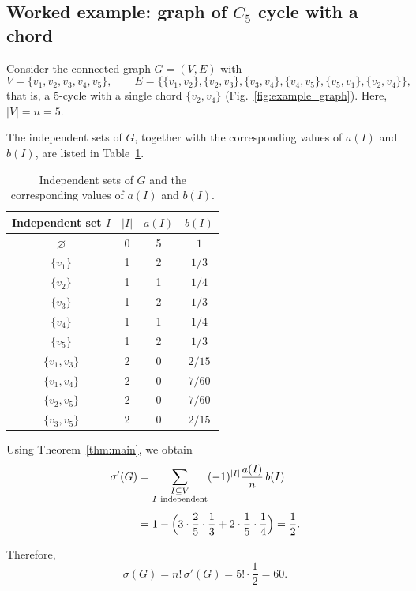 \documentclass[11pt,a4paper]{article}
\numberwithin{equation}{section}
\theoremstyle{plain}
\theoremstyle{definition}
\theoremstyle{remark}
\begin{document}
\subsection{Worked example: graph of $C_5$ cycle with a chord}

Consider the connected graph \(G=(V,E)\) with
\[
V=\{v_1,v_2,v_3,v_4,v_5\},\qquad
E=\{\{v_1,v_2\},\{v_2,v_3\},\{v_3,v_4\},\{v_4,v_5\},\{v_5,v_1\},\{v_2,v_4\}\},
\]
that is, a \(5\)-cycle with a single chord \(\{v_2,v_4\}\) (Fig.~\ref{fig:example_graph}). Here, \(|V| = n =5\).

The independent sets of \(G\), together with the corresponding values of
\(a(I)\) and \(b(I)\), are listed in Table~\ref{tab:example_values}.

\begin{table}[h]
\centering
\begin{tabular}{cccc}
\toprule
Independent set \(I\) & \(|I|\) & \(a(I)\) & \(b(I)\) \\
\midrule
\(\varnothing\) & 0 & 5 & \(1\) \\
\(\{v_1\}\) & 1 & 2 & \(1/3\) \\
\(\{v_2\}\) & 1 & 1 & \(1/4\) \\
\(\{v_3\}\) & 1 & 2 & \(1/3\) \\
\(\{v_4\}\) & 1 & 1 & \(1/4\) \\
\(\{v_5\}\) & 1 & 2 & \(1/3\) \\
\(\{v_1,v_3\}\) & 2 & 0 & \(2/15\) \\
\(\{v_1,v_4\}\) & 2 & 0 & \(7/60\) \\
\(\{v_2,v_5\}\) & 2 & 0 & \(7/60\) \\
\(\{v_3,v_5\}\) & 2 & 0 & \(2/15\) \\
\bottomrule
\end{tabular}
\caption{Independent sets of \(G\) and the corresponding values of \(a(I)\) and \(b(I)\).}
\label{tab:example_values}
\end{table}

Using Theorem~\ref{thm:main}, we obtain
\[
\begin{aligned}
\sigma'(G)
&=
\sum_{\substack{I\subseteq V\\ I\ \mathrm{independent}}}
(-1)^{|I|}\frac{a(I)}{n}\,b(I) \\[4pt]
&=
1-
\Bigl(
3\cdot\frac{2}{5}\cdot\frac{1}{3}
+
2\cdot\frac{1}{5}\cdot\frac{1}{4}
\Bigr)
=\frac{1}{2}.
\end{aligned}
\]

Therefore,
\[
\sigma(G)=n!\,\sigma'(G)=5!\cdot\frac{1}{2}=60.
\]
\end{document}
